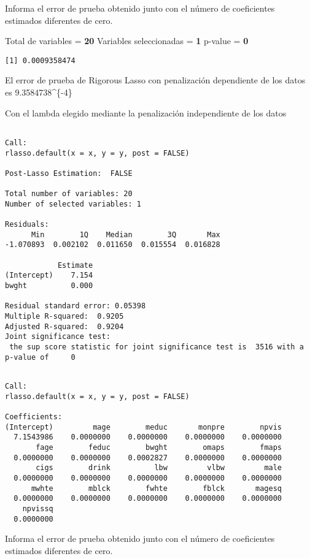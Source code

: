 \documentclass[]{article}
\begin{document}
Informa el error de prueba obtenido junto con el número de coeficientes
estimados diferentes de cero.

Total de variables = \textbf{20} Variables seleccionadas = \textbf{1}
p-value = \textbf{0}

\begin{verbatim}
[1] 0.0009358474
\end{verbatim}

El error de prueba de Rigorous Lasso con penalización dependiente de los
datos es 9.3584738\^{}\{-4\}

Con el lambda elegido mediante la penalización independiente de los
datos

\begin{verbatim}

Call:
rlasso.default(x = x, y = y, post = FALSE)

Post-Lasso Estimation:  FALSE 

Total number of variables: 20
Number of selected variables: 1 

Residuals: 
      Min        1Q    Median        3Q       Max 
-1.070893  0.002102  0.011650  0.015554  0.016828 

            Estimate
(Intercept)    7.154
bwght          0.000

Residual standard error: 0.05398
Multiple R-squared:  0.9205
Adjusted R-squared:  0.9204
Joint significance test:
 the sup score statistic for joint significance test is  3516 with a p-value of     0
\end{verbatim}

\begin{verbatim}

Call:
rlasso.default(x = x, y = y, post = FALSE)

Coefficients:
(Intercept)         mage        meduc       monpre        npvis  
  7.1543986    0.0000000    0.0000000    0.0000000    0.0000000  
       fage        feduc        bwght        omaps        fmaps  
  0.0000000    0.0000000    0.0002827    0.0000000    0.0000000  
       cigs        drink          lbw         vlbw         male  
  0.0000000    0.0000000    0.0000000    0.0000000    0.0000000  
      mwhte        mblck        fwhte        fblck       magesq  
  0.0000000    0.0000000    0.0000000    0.0000000    0.0000000  
    npvissq  
  0.0000000  
\end{verbatim}

Informa el error de prueba obtenido junto con el número de coeficientes
estimados diferentes de cero.
\end{document}

